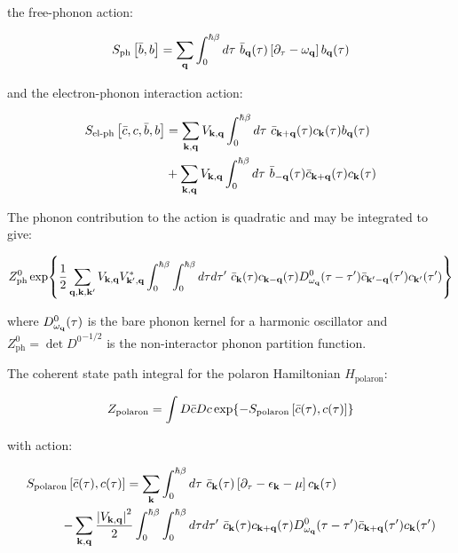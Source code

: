 the free-phonon action:

\begin{equation}
        S_{\text{ph}}\left[\Bar{b}, b\right] =  \sum_{\vb{q}} \int_0^{\hbar\beta} d\tau\ \Bar{b}_{\vb{q}}(\tau) \left[\partial_{\tau} - \omega_{\vb{q}} \right] b_{\vb{q}}(\tau)
\end{equation}

and the electron-phonon interaction action:

\begin{equation}
    \begin{aligned}
        S_{\text{el-ph}}\left[\Bar{c}, c, \Bar{b}, b\right] &=  \sum_{\vb{k},\vb{q}} V_{\vb{k}, \vb{q}} \int_0^{\hbar\beta} d\tau\ \Bar{c}_{\vb{k}+\vb{q}}(\tau) c_{\vb{k}}(\tau) b_{\vb{q}}(\tau) \\
        &+ \sum_{\vb{k},\vb{q}} V_{\vb{k}, \vb{q}} \int_0^{\hbar\beta} d\tau\ \Bar{b}_{-\vb{q}}(\tau) \Bar{c}_{\vb{k}+\vb{q}}(\tau) c_{\vb{k}}(\tau)
    \end{aligned}
\end{equation}

The phonon contribution to the action is quadratic and may be integrated to give:

\begin{equation}
    Z^0_{\text{ph}} \exp{\frac{1}{2} \sum_{\vb{q}, \vb{k}, \vb{k}'} V_{\vb{k}, \vb{q}} V^*_{\vb{k}', \vb{q}} \int_0^{\hbar\beta} \int_0^{\hbar\beta} d\tau d\tau'\ \Bar{c}_{\vb{k}}(\tau) c_{\vb{k} - \vb{q}} (\tau) D^0_{\omega_{\vb{q}}}(\tau - \tau') \Bar{c}_{\vb{k}'-\vb{q}}(\tau') c_{\vb{k}'}(\tau')}
\end{equation}

where $D^0_{\omega_{\vb{q}}}(\tau)$ is the bare phonon kernel for a harmonic oscillator and $Z^0_{\text{ph}} = \det{D^0}^{-1/2}$ is the non-interactor phonon partition function.

The coherent state path integral for the polaron Hamiltonian $H_{\text{polaron}}$:

\begin{equation}
    Z_{\text{polaron}} = \int D\Bar{c} Dc \exp{-S_{\text{polaron}}\left[\Bar{c}(\tau), c(\tau)\right]}
\end{equation}

with action:

\begin{equation}
    \begin{aligned}
        S_{\text{polaron}}\left[\Bar{c}(\tau), c(\tau)\right] =  \sum_{\vb{k}} &\int_0^{\hbar\beta} d\tau\ \Bar{c}_{\vb{k}}(\tau) \left[\partial_{\tau} - \epsilon_{\vb{k}} - \mu \right] c_{\vb{k}}(\tau) \\
        - \sum_{\vb{k}, \vb{q}} \frac{\abs{V_{\vb{k}, \vb{q}}}^2}{2} \int_0^{\hbar\beta} &\int_0^{\hbar\beta} d\tau d\tau'\ \Bar{c}_{\vb{k}}(\tau) c_{\vb{k}+\vb{q}}(\tau) D^0_{\omega_{\vb{q}}}(\tau - \tau') \Bar{c}_{\vb{k}+\vb{q}}(\tau') c_{\vb{k}}(\tau') 
    \end{aligned}
\end{equation}